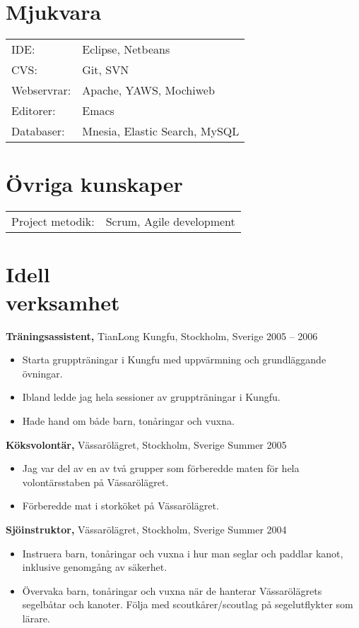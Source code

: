 \documentclass[margin]{res}
\begin{document}
\begin{resume}
\section{Mjukvara}
\begin{tabular}{l p{3in}}
  IDE: & Eclipse, Netbeans \\
  CVS: & Git, SVN \\
  Webservrar: & Apache, YAWS, Mochiweb \\
  Editorer: & Emacs \\
  Databaser: & Mnesia, Elastic Search, MySQL
\end{tabular}

\section{Övriga kunskaper}
\begin{tabular}{l p{3in}}
  Project metodik: & Scrum, Agile development
\end{tabular}

\section{Idell \\ verksamhet}
{\bf Träningsassistent,} TianLong Kungfu, Stockholm, Sverige \hfill 2005 -- 2006
\begin{itemize} \itemsep -2pt
\item Starta gruppträningar i Kungfu med uppvärmning och grundläggande övningar.
\item Ibland ledde jag hela sessioner av gruppträningar i Kungfu.
\item Hade hand om både barn, tonåringar och vuxna.
\end{itemize}

{\bf Köksvolontär,} Vässarölägret, Stockholm, Sverige \hfill Summer 2005
\begin{itemize} \itemsep -2pt
\item Jag var del av en av två grupper som förberedde maten för hela volontärsstaben på Vässarölägret.
\item Förberedde mat i storköket på Vässarölägret.
\end{itemize}

{\bf Sjöinstruktor,} Vässarölägret, Stockholm, Sverige \hfill Summer 2004
\begin{itemize} \itemsep -2pt
\item Instruera barn, tonåringar och vuxna i hur man seglar och paddlar kanot, inklusive genomgång av säkerhet.
\item Övervaka barn, tonåringar och vuxna när de hanterar Vässarölägrets segelbåtar och kanoter. Följa med scoutkårer/scoutlag på segelutflykter som lärare.
\end{itemize}


\end{resume}
\end{document}
